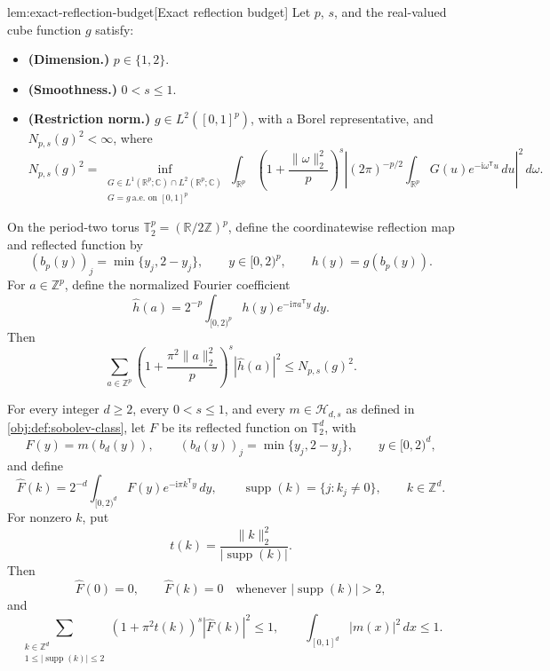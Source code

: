 \documentclass[11pt]{article}
\begin{document}
\begin{lemmav}{lem:exact-reflection-budget}[Exact reflection budget]
Let \(p\), \(s\), and the real-valued cube function \(g\) satisfy:
\begin{itemize}
\item \textbf{(Dimension.)} \(p\in\{1,2\}\).
\item \textbf{(Smoothness.)} \(0<s\leq1\).
\item \textbf{(Restriction norm.)} \(g\in L^2([0,1]^p)\), with a Borel representative, and \(N_{p,s}(g)^2<\infty\), where
\[
N_{p,s}(g)^2
=
\inf_{\substack{G\in L^1(\mathbb R^p;\mathbb C)\cap L^2(\mathbb R^p;\mathbb C)\\
G=g\ \text{a.e. on }[0,1]^p}}
\int_{\mathbb R^p}
\left(1+\frac{\|\omega\|_2^2}{p}\right)^s
\left|
(2\pi)^{-p/2}
\int_{\mathbb R^p}G(u)e^{-\mathrm i\omega^{\mathsf T}u}\,du
\right|^2\,d\omega .
\]
\end{itemize}
On the period-two torus \(\mathbb T_2^p=(\mathbb R/2\mathbb Z)^p\), define the coordinatewise reflection map and reflected function by
\[
(b_p(y))_j=\min\{y_j,2-y_j\},
\qquad y\in[0,2)^p,
\qquad h(y)=g(b_p(y)).
\]
For \(a\in\mathbb Z^p\), define the normalized Fourier coefficient
\[
\widehat h(a)
=
2^{-p}\int_{[0,2)^p}h(y)e^{-\mathrm i\pi a^{\mathsf T}y}\,dy .
\]
Then
\[
\sum_{a\in\mathbb Z^p}
\left(1+\frac{\pi^2\|a\|_2^2}{p}\right)^s
|\widehat h(a)|^2
\leq N_{p,s}(g)^2 .
\]

For every integer \(d\geq2\), every \(0<s\leq1\), and every \(m\in\mathcal H_{d,s}\) as defined in \cref{obj:def:sobolev-class}, let \(F\) be its reflected function on \(\mathbb T_2^d\), with
\[
F(y)=m(b_d(y)),
\qquad
(b_d(y))_j=\min\{y_j,2-y_j\},
\qquad y\in[0,2)^d,
\]
and define
\[
\widehat F(k)
=
2^{-d}\int_{[0,2)^d}F(y)e^{-\mathrm i\pi k^{\mathsf T}y}\,dy,
\qquad
\operatorname{supp}(k)=\{j:k_j\neq0\},
\qquad k\in\mathbb Z^d.
\]
For nonzero \(k\), put
\[
t(k)=\frac{\|k\|_2^2}{|\operatorname{supp}(k)|}.
\]
Then
\[
\widehat F(0)=0,
\qquad
\widehat F(k)=0
\quad\text{whenever }|\operatorname{supp}(k)|>2,
\]
and
\[
\sum_{\substack{k\in\mathbb Z^d\\1\leq|\operatorname{supp}(k)|\leq2}}
(1+\pi^2t(k))^s|\widehat F(k)|^2\leq1,
\qquad
\int_{[0,1]^d}|m(x)|^2\,dx\leq1.
\]
\end{lemmav}
\end{document}
